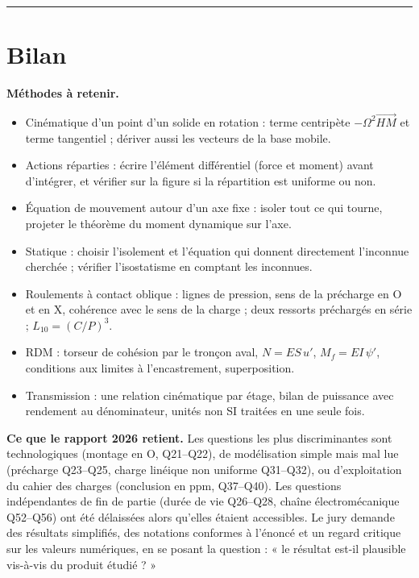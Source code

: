 \documentclass[11pt,a4paper]{article}
\providecommand{\tightlist}{\setlength{\itemsep}{0pt}\setlength{\parskip}{0pt}}
\begin{document}
\begin{center}\rule{0.5\linewidth}{0.5pt}\end{center}

\hypertarget{bilan}{%
\section{Bilan}\label{bilan}}

\textbf{Méthodes à retenir.}

\begin{itemize}
\tightlist
\item
  Cinématique d'un point d'un solide en rotation : terme centripète \(-\Omega^2\vec{HM}\) et terme tangentiel ; dériver aussi les vecteurs de la base mobile.
\item
  Actions réparties : écrire l'élément différentiel (force et moment) avant d'intégrer, et vérifier sur la figure si la répartition est uniforme ou non.
\item
  Équation de mouvement autour d'un axe fixe : isoler tout ce qui tourne, projeter le théorème du moment dynamique sur l'axe.
\item
  Statique : choisir l'isolement et l'équation qui donnent directement l'inconnue cherchée ; vérifier l'isostatisme en comptant les inconnues.
\item
  Roulements à contact oblique : lignes de pression, sens de la précharge en O et en X, cohérence avec le sens de la charge ; deux ressorts préchargés en série ; \(L_{10} = (C/P)^3\).
\item
  RDM : torseur de cohésion par le tronçon aval, \(N = ES\,u'\), \(M_f = EI\,\psi'\), conditions aux limites à l'encastrement, superposition.
\item
  Transmission : une relation cinématique par étage, bilan de puissance avec rendement au dénominateur, unités non SI traitées en une seule fois.
\end{itemize}

\textbf{Ce que le rapport 2026 retient.} Les questions les plus discriminantes sont technologiques (montage en O, Q21--Q22), de modélisation simple mais mal lue (précharge Q23--Q25, charge linéique non uniforme Q31--Q32), ou d'exploitation du cahier des charges (conclusion en ppm, Q37--Q40). Les questions indépendantes de fin de partie (durée de vie Q26--Q28, chaîne électromécanique Q52--Q56) ont été délaissées alors qu'elles étaient accessibles. Le jury demande des résultats simplifiés, des notations conformes à l'énoncé et un regard critique sur les valeurs numériques, en se posant la question : « le résultat est-il plausible vis-à-vis du produit étudié ? »
\end{document}
